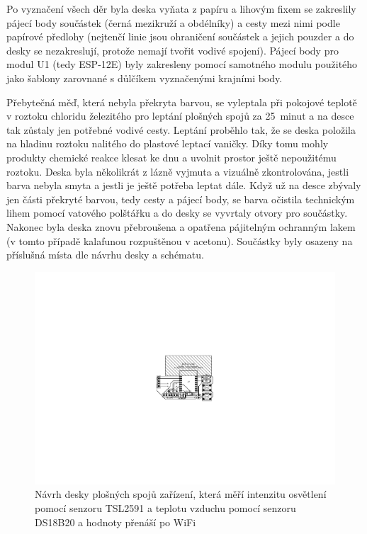        Po vyznačení všech děr byla deska vyňata z papíru a lihovým fixem se zakreslily pájecí body součástek (černá mezikruží a obdélníky) a cesty mezi nimi podle papírové předlohy (nejtenčí linie jsou ohraničení součástek a jejich pouzder a do desky se nezakreslují, protože nemají tvořit vodivé spojení). Pájecí body pro modul U1 (tedy ESP-12E) byly zakresleny pomocí samotného modulu použitého jako šablony zarovnané s důlčíkem vyznačenými krajními body.
        
        Přebytečná měď, která nebyla překryta barvou, se vyleptala při pokojové teplotě v roztoku chloridu železitého pro leptání plošných spojů za 25~minut a na desce tak zůstaly jen potřebné vodivé cesty. Leptání proběhlo tak, že se deska položila na hladinu roztoku nalitého do plastové leptací vaničky. Díky tomu mohly produkty chemické reakce klesat ke dnu a uvolnit prostor ještě nepoužitému roztoku. Deska byla několikrát z lázně vyjmuta a vizuálně zkontrolována, jestli barva nebyla smyta a jestli je ještě potřeba leptat dále. Když už na desce zbývaly jen části překryté barvou, tedy cesty a pájecí body, se barva očistila technickým lihem pomocí vatového polštářku a do desky se vyvrtaly otvory pro součástky. Nakonec byla deska znovu přebroušena a opatřena pájitelným ochranným lakem (v tomto případě kalafunou rozpuštěnou v acetonu). Součástky byly osazeny na příslušná místa dle návrhu desky a schématu.
        \begin{figure}
            \centering
            \includegraphics[draft=false,width=\textwidth,trim={11.8cm 8.2cm 11.8cm 8.2cm},clip]{img/hw/esp_lux_temp_dps.pdf}
            \caption[Návrh \acrshort{dps} měřicích zařízení]{Návrh desky plošných spojů zařízení, která měří intenzitu osvětlení pomocí senzoru TSL2591 a teplotu vzduchu pomocí senzoru DS18B20 a hodnoty přenáší po WiFi}
            \label{fig:dps}
        \end{figure}
